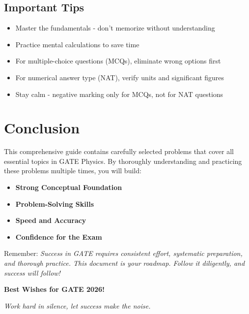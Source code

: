 \documentclass[12pt,a4paper]{article}
\begin{document}
\subsection*{Important Tips}
\begin{itemize}
    \item Master the fundamentals - don't memorize without understanding
    \item Practice mental calculations to save time
    \item For multiple-choice questions (MCQs), eliminate wrong options first
    \item For numerical answer type (NAT), verify units and significant figures
    \item Stay calm - negative marking only for MCQs, not for NAT questions
\end{itemize}

\section*{Conclusion}

This comprehensive guide contains carefully selected problems that cover all essential topics in GATE Physics. By thoroughly understanding and practicing these problems multiple times, you will build:

\begin{itemize}
    \item \textbf{Strong Conceptual Foundation}
    \item \textbf{Problem-Solving Skills}
    \item \textbf{Speed and Accuracy}
    \item \textbf{Confidence for the Exam}
\end{itemize}

Remember: \textit{Success in GATE requires consistent effort, systematic preparation, and thorough practice. This document is your roadmap. Follow it diligently, and success will follow!}

\vspace{2cm}

\begin{center}
\Large\textbf{Best Wishes for GATE 2026!}

\vspace{0.5cm}

\textit{Work hard in silence, let success make the noise.}
\end{center}
\end{document}
